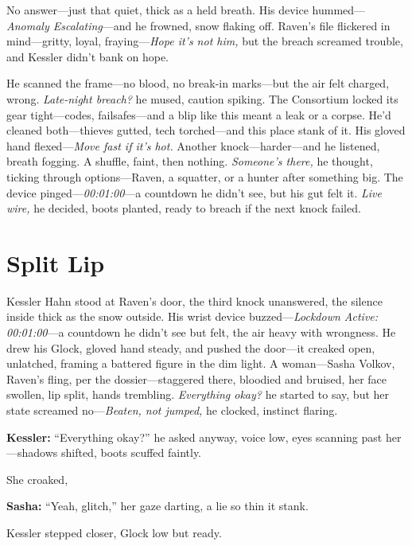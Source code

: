 \documentclass[12pt]{book}
\begin{document}
No answer—just that quiet, thick as a held breath. His device hummed—\emph{Anomaly Escalating}—and he frowned, snow flaking off. Raven’s file flickered in mind—gritty, loyal, fraying—\emph{Hope it’s not him,} but the breach screamed trouble, and Kessler didn’t bank on hope.

He scanned the frame—no blood, no break-in marks—but the air felt charged, wrong. \emph{Late-night breach?} he mused, caution spiking. The Consortium locked its gear tight—codes, failsafes—and a blip like this meant a leak or a corpse. He’d cleaned both—thieves gutted, tech torched—and this place stank of it. His gloved hand flexed—\emph{Move fast if it’s hot.} Another knock—harder—and he listened, breath fogging. A shuffle, faint, then nothing. \emph{Someone’s there,} he thought, ticking through options—Raven, a squatter, or a hunter after something big. The device pinged—\emph{00:01:00}—a countdown he didn’t see, but his gut felt it. \emph{Live wire,} he decided, boots planted, ready to breach if the next knock failed.

\vspace{1em}

\section{Split Lip}

Kessler Hahn stood at Raven’s door, the third knock unanswered, the silence inside thick as the snow outside. His wrist device buzzed—\emph{Lockdown Active: 00:01:00}—a countdown he didn’t see but felt, the air heavy with wrongness. He drew his Glock, gloved hand steady, and pushed the door—it creaked open, unlatched, framing a battered figure in the dim light. A woman—Sasha Volkov, Raven’s fling, per the dossier—staggered there, bloodied and bruised, her face swollen, lip split, hands trembling. \emph{Everything okay?} he started to say, but her state screamed no—\emph{Beaten, not jumped,} he clocked, instinct flaring.

\vspace{0.5em}
\textbf{Kessler:} “Everything okay?” he asked anyway, voice low, eyes scanning past her—shadows shifted, boots scuffed faintly.

She croaked, 

\vspace{0.5em}
\textbf{Sasha:} “Yeah, glitch,” her gaze darting, a lie so thin it stank.

Kessler stepped closer, Glock low but ready. 
\end{document}

